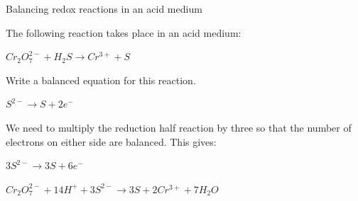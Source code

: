 \begin{wex}{Balancing redox reactions in an acid medium\\}{The following reaction takes place in an acid medium:

\begin{center}
\rm${Cr_{2}O_{7}^{2-} + H_{2}S \rightarrow Cr^{3+} + S}$
\end{center}

Write a balanced equation for this reaction.\\}
{\begin{center}
\rm${S^{2-} \rightarrow S + 2e^{-}}$\\
\end{center}

We need to multiply the reduction half reaction by three so that the number of electrons on either side are balanced. This gives:

\begin{center}
\rm${3S^{2-} \rightarrow 3S + 6e^{-}}$\\
\end{center}

\begin{center}
\rm${Cr_{2}O_{7}^{2-} + 14H^{+} + 3S^{2-} \rightarrow 3S + 2Cr^{3+} + 7H_{2}O}$\\
\end{center}
}
\end{wex}

